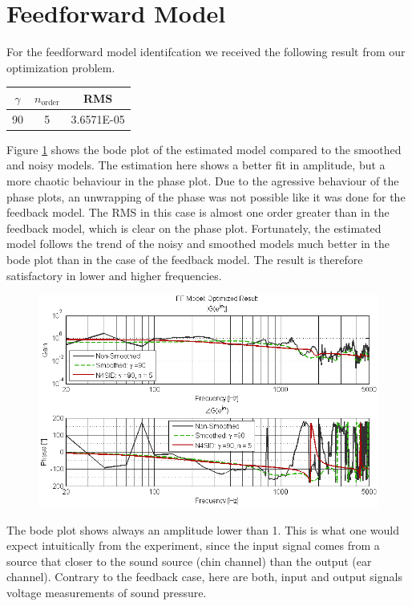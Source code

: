 \section{Feedforward Model}
For the feedforward model identifcation we received the following result from our optimization problem. 

\begin{table}[H]
\centering
\begin{tabular}{c|c|c}
$\gamma$ & $n_\text{order}$ & RMS \\ \hline
90 & 5 & 3.6571E-05 \\ 
\end{tabular}
\end{table}

Figure \ref{} shows the bode plot of the estimated model compared to the smoothed and noisy models. The estimation here shows a better fit in amplitude, but a more chaotic behaviour in the phase plot. Due to the agressive behaviour of the phase plots, an unwrapping of the phase was not possible like it was done for the feedback model. The RMS in this case is almost one order greater than in the feedback model, which is clear on the phase plot. Fortunately, the estimated model follows the trend of the noisy and smoothed models much better in the bode plot than in the case of the feedback model. The result is therefore satisfactory in lower and higher frequencies.\\

\begin{figure}[h]
\centering
\includegraphics[width=1.0\textwidth]{pics/results_FF}
\caption{}
\label{pic:}
\end{figure}

The bode plot shows always an amplitude lower than 1. This is what one would expect intuitically from the experiment, since the input signal comes from a source that closer to the sound source (chin channel) than the output (ear channel). Contrary to the feedback case, here are both, input and output signals voltage measurements of sound pressure.

